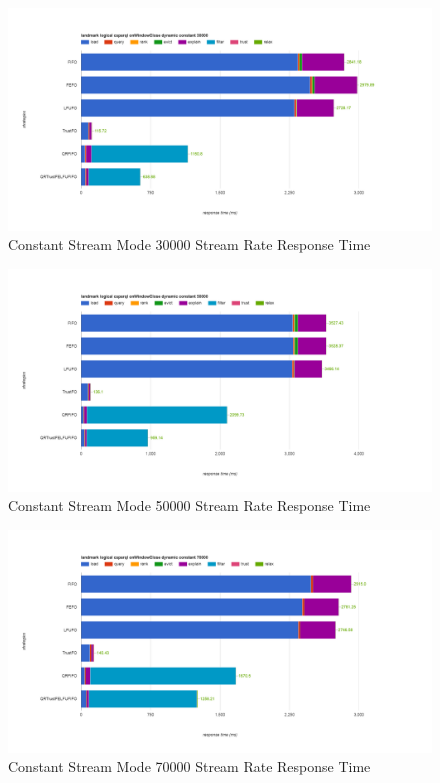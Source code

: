\begin{figure}[!htbp]
    \centering
    \includegraphics[width=\textwidth]{img/app3-c-30000-r.png}
    \caption{Constant Stream Mode 30000 Stream Rate Response Time}
\end{figure}
\begin{figure}[!htbp]
    \centering
    \includegraphics[width=\textwidth]{img/app3-c-50000-r.png}
    \caption{Constant Stream Mode 50000 Stream Rate Response Time}
\end{figure}
\begin{figure}[!htbp]
    \centering
    \includegraphics[width=\textwidth]{img/app3-c-70000-r.png}
    \caption{Constant Stream Mode 70000 Stream Rate Response Time}
\end{figure}
